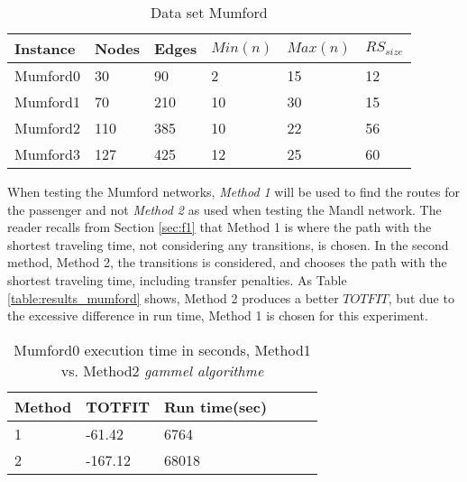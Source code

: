 \begin{table}[H]
	\centering
	\begin{tabular}{|l|l|l|l|l|l|}
    	\hline
    	Instance & Nodes&Edges & $Min(n)$ & $Max(n)$ & $RS_{size}$\\
    	\hline
   	    Mumford0 & 30&90 & 2&15 & 12 \\
   	    Mumford1 & 70&210 & 10&30 & 15 \\
   	    Mumford2 & 110&385 & 10&22 & 56 \\
   	    Mumford3 & 127&425 & 12&25 & 60 \\
   	    \hline
    \end{tabular}
    \caption{Data set Mumford}
    \label{table:dataSet_mumford}
\end{table}

When testing the Mumford networks, \textit{Method 1} will be used to find the routes for the passenger and not \textit{Method 2} as used when testing the Mandl network. The reader recalls from Section \vref{sec:f1} that Method 1 is where the path with the shortest traveling time, not considering any transitions, is chosen. In the second method, Method 2, the transitions is considered, and chooses the path with the shortest traveling time, including transfer penalties. As Table \vref{table:results_mumford} shows, Method 2 produces a better $TOTFIT$, but due to the excessive difference in run time, Method 1 is chosen for this experiment. 

\begin{table}[H]
    \centering
    \begin{tabular}{|l|l|l|l|l|l|}
        \hline
        Method & TOTFIT & Run time(sec) \\
        \hline
        1 & -61.42 & 6764 \\
        2 & -167.12 & 68018 \\
        \hline
    \end{tabular}
    \caption{Mumford0 execution time in seconds, Method1 vs. Method2 \emph{\color{blue} gammel algorithme}}
    \label{table:results_mumford}
\end{table}

